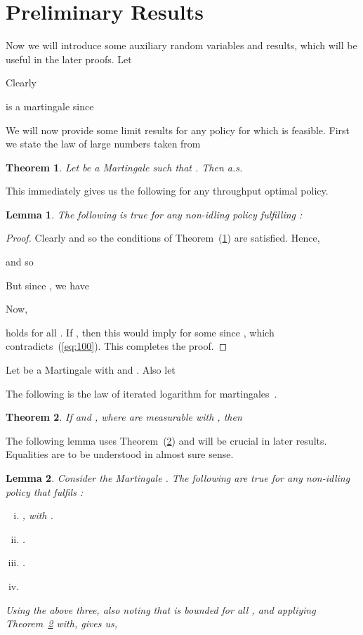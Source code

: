 \documentclass[letterpaper, 10 pt, conference]{ieeeconf}
\newtheorem{lemma}{Lemma}
\newtheorem{theorem}{Theorem}
\begin{document}
\section{Preliminary Results}\label{sec3}
Now we will introduce some auxiliary random variables and results, which will be useful in the later proofs. 
Let 

Clearly 

is a martingale since

We will now provide some limit results for any policy for which  is feasible. First we state the law of large numbers taken from~\cite{c6}\\
\begin{theorem}\label{llnmartingale}
Let  be a Martingale such that . Then  a.s.
\end{theorem}
This immediately gives us the following for any throughput optimal policy.
\begin{lemma}\label{lemma2.5}
The following is true for any non-idling policy fulfilling :

\end{lemma}
\begin{proof}
 Clearly  and so the conditions of Theorem~(\ref{llnmartingale}) are satisfied. Hence,

and so

But since , we have 

Now, 

holds for all . If , then this would imply  for some  since , which contradicts~(\ref{eq:100}). This completes the proof.
\end{proof}
Let  be a Martingale with  and . Also let 

The following is the law of iterated logarithm for martingales~\cite{c4}.
\begin{theorem}
\label{theorem:stout}
If  and , where  are  measurable with , then 

\end{theorem}
 The following lemma uses Theorem~(\ref{theorem:stout}) and will be crucial in later results. Equalities are to be understood in almost sure sense.
 \begin{lemma}\label{lemma3}
 Consider the Martingale . The following are true for any non-idling policy that fulfils :
 \begin{enumerate}[(i).]
 \item , with . 
 \item .
 \item .
 \item 
 \end{enumerate}
 Using the above three, also noting that  is bounded for all , and appliying Theorem~\ref{theorem:stout} with,  gives us,
 
 \end{lemma}
\end{document}
